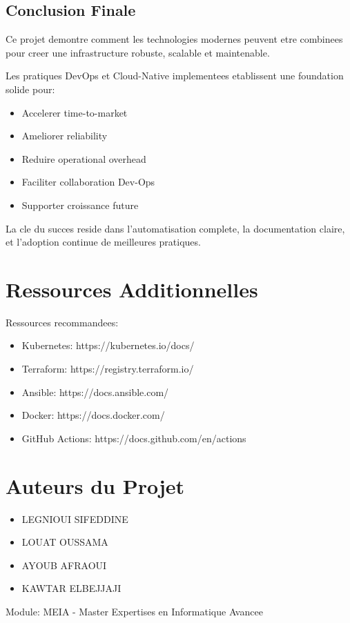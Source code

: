 \documentclass[12pt,a4paper]{report}
\begin{document}
\section{Conclusion Finale}

Ce projet demontre comment les technologies modernes peuvent etre combinees pour creer une infrastructure robuste, scalable et maintenable.

Les pratiques DevOps et Cloud-Native implementees etablissent une foundation solide pour:

\begin{itemize}
    \item Accelerer time-to-market
    \item Ameliorer reliability
    \item Reduire operational overhead
    \item Faciliter collaboration Dev-Ops
    \item Supporter croissance future
\end{itemize}

La cle du succes reside dans l'automatisation complete, la documentation claire, et l'adoption continue de meilleures pratiques.

\newpage

\appendix

\chapter{Ressources Additionnelles}

Ressources recommandees:

\begin{itemize}
    \item Kubernetes: https://kubernetes.io/docs/
    \item Terraform: https://registry.terraform.io/
    \item Ansible: https://docs.ansible.com/
    \item Docker: https://docs.docker.com/
    \item GitHub Actions: https://docs.github.com/en/actions
\end{itemize}

\chapter{Auteurs du Projet}

\begin{itemize}
    \item LEGNIOUI SIFEDDINE
    \item LOUAT OUSSAMA
    \item AYOUB AFRAOUI
    \item KAWTAR ELBEJJAJI
\end{itemize}

Module: MEIA - Master Expertises en Informatique Avancee
\end{document}
